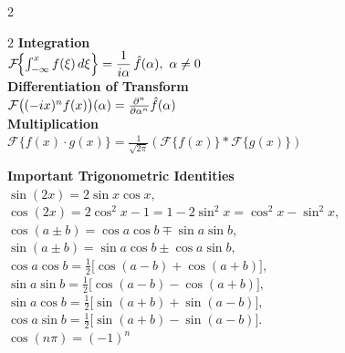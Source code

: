 \documentclass[8pt]{article}
\begin{document}
\begin{multicols}{2}
\begin{minipage}[htp]{0.55\textwidth}
\begin{multicols}{2}
			\textbf{Integration} \\
			$\mathcal{F}\!\Bigl\{\int_{-\infty}^x f(\xi)\,d\xi\Bigr\}
				= \dfrac{1}{i\alpha}\,\hat{f}(\alpha), \ \alpha \neq 0$ \\[4pt]

			\textbf{Differentiation of Transform} \\[2pt]
			$
				\mathcal{F}\big((-ix)^n f(x)\big)(\alpha) = \frac{\partial^n}{\partial \alpha^n} \hat{f}(\alpha) \\[4pt]
			$\\[-3px]
			\textbf{Multiplication} \\
			$
				\mathcal{F}\{f(x) \cdot g(x)\} = \frac{1}{\sqrt{2\pi}}\left( \mathcal{F}\{f(x)\} * \mathcal{F}\{g(x)\} \right)
			$ \\
		\end{multicols}
	\end{minipage}
	\normalsize
	\noindent \textbf{Important Trigonometric Identities} \\[2pt]
	$\sin(2x) = 2\sin x\cos x,$ \\[3pt]
	$\cos(2x) = 2\cos^2 x - 1 = 1 - 2\sin^2 x = \cos^2 x - \sin^2 x,$ \\[3pt]
	$\cos(a \pm b) = \cos a\cos b \mp \sin a\sin b,$ \\[3pt]
	$\sin(a \pm b) = \sin a\cos b \pm \cos a\sin b,$ \\[3pt]
	$\cos a\cos b = \tfrac{1}{2}\bigl[\cos(a - b) + \cos(a + b)\bigr],$ \\[3pt]
	$\sin a\sin b = \tfrac{1}{2}\bigl[\cos(a - b) - \cos(a + b)\bigr],$ \\[3pt]
	$\sin a\cos b = \tfrac{1}{2}\bigl[\sin(a + b) + \sin(a - b)\bigr],$ \\[3pt]
	$\cos a\sin b = \tfrac{1}{2}\bigl[\sin(a + b) - \sin(a - b)\bigr].$\\[3pt]
	$\cos(n \pi) = (-1)^n$
	\normalsize
\end{multicols}
\endgroup
\end{document}
